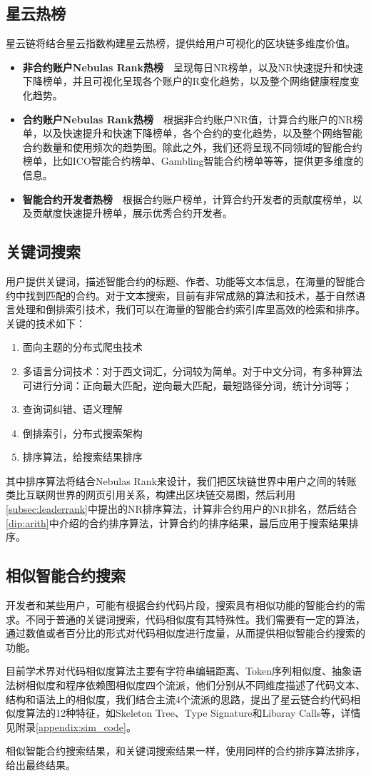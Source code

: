 \subsection{星云热榜}
星云链将结合星云指数构建星云热榜，提供给用户可视化的区块链多维度价值。
\begin{itemize}
\item \textbf{非合约账户Nebulas Rank热榜}~~呈现每日NR榜单，以及NR快速提升和快速下降榜单，并且可视化呈现各个账户的R变化趋势，以及整个网络健康程度变化趋势。
\item \textbf{合约账户Nebulas Rank热榜}~~根据非合约账户NR值，计算合约账户的NR榜单，以及快速提升和快速下降榜单，各个合约的变化趋势，以及整个网络智能合约数量和使用频次的趋势图。除此之外，我们还将呈现不同领域的智能合约榜单，比如ICO智能合约榜单、Gambling智能合约榜单等等，提供更多维度的信息。
\item \textbf{智能合约开发者热榜}~~根据合约账户榜单，计算合约开发者的贡献度榜单，以及贡献度快速提升榜单，展示优秀合约开发者。
\end{itemize}

\subsection{关键词搜索}
用户提供关键词，描述智能合约的标题、作者、功能等文本信息，在海量的智能合约中找到匹配的合约。对于文本搜索，目前有非常成熟的算法和技术，基于自然语言处理和倒排索引技术，我们可以在海量的智能合约索引库里高效的检索和排序。关键的技术如下：

\begin{enumerate}
	\item 面向主题的分布式爬虫技术
	\item 多语言分词技术：对于西文词汇，分词较为简单。对于中文分词，有多种算法可进行分词：正向最大匹配，逆向最大匹配，最短路径分词，统计分词等；
	\item 查询词纠错、语义理解
	\item 倒排索引，分布式搜索架构
	\item 排序算法，给搜索结果排序
\end{enumerate}

其中排序算法将结合Nebulas Rank来设计，我们把区块链世界中用户之间的转账类比互联网世界的网页引用关系，构建出区块链交易图，然后利用\ref{subsec:leaderrank}中提出的NR排序算法，计算非合约用户的NR排名，然后结合\ref{dip:arith}中介绍的合约排序算法，计算合约的排序结果，最后应用于搜索结果排序。


\subsection{相似智能合约搜索}
开发者和某些用户，可能有根据合约代码片段，搜索具有相似功能的智能合约的需求。不同于普通的关键词搜索，代码相似度有其特殊性。我们需要有一定的算法，通过数值或者百分比的形式对代码相似度进行度量，从而提供相似智能合约搜索的功能。

目前学术界对代码相似度算法主要有字符串编辑距离、Token序列相似度、抽象语法树相似度和程序依赖图相似度四个流派，他们分别从不同维度描述了代码文本、结构和语法上的相似度，我们结合主流4个流派的思路，提出了星云链合约代码相似度算法的12种特征，如Skeleton Tree、Type Signature和Libaray Calls等，详情见附录\ref{appendix:sim_code}。

相似智能合约搜索结果，和关键词搜索结果一样，使用同样的合约排序算法排序，给出最终结果。
